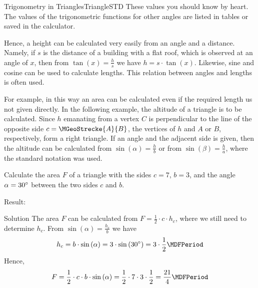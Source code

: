 \begin{MXContent}{Trigonometry in Triangles}{Triangle}{STD}
These values you should know by heart. The values of the trigonometric functions for other
angles are listed in tables or saved in the calculator.

Hence, a height can be calculated very easily from an angle and a distance. 
Namely, if $s$ is the distance of a building with a flat roof, which is observed 
at an angle of $x$, then from $\tan(x) = \frac{h}{s}$ we have  $h = s \cdot \tan(x)$. 
Likewise, sine and cosine can be used to calculate lengths. This relation between 
angles and lengths is often used.

For example, in this way an area can be calculated even if the required 
length us not given directly. In the following example, the altitude
of a triangle is to be calculated. Since $h$ emanating from a vertex $C$ 
is perpendicular to the line of the opposite side
$c = \MGeoStrecke{A}{B}$, the vertices of $h$ and  $A$ or $B$, respectively, 
form a right triangle. If an angle and the adjacent side is given, then 
the altitude can be calculated from $\sin(\alpha) = \frac{h}{b}$ or from
$\sin(\beta) = \frac{h}{a}$, where the standard notation was used.


\begin{MExercise}
Calculate the area $F$ of a triangle with the sides $c = 7$, $b = 3$,  and 
the angle $\alpha = 30^{\circ}$ between the two sides $c$ and $b$.

Result: %

\begin{MHint}{Solution}
The area $F$ can be calculated from $F =\frac{1}{2}\cdot c \cdot h_c$, where we
still need to determine $h_c$. From $\sin\left(\alpha\right)=\frac{h_c}{b}$
we have
\[
 h_c=b\cdot\sin\left(\alpha\right) %
  = 3\cdot\sin\left(30\MGrad\right) %
  = 3\cdot\frac{1}{2} \MDFPeriod %
\]
Hence,
\[ 
F =\frac{1}{2}\cdot c\cdot b\cdot\sin\left(\alpha\right) %
  =\frac{1}{2}\cdot 7 \cdot3\cdot\frac{1}{2}=\frac{21}{4} \MDFPeriod %
\]
\end{MHint}
\end{MExercise}

\end{MXContent}


